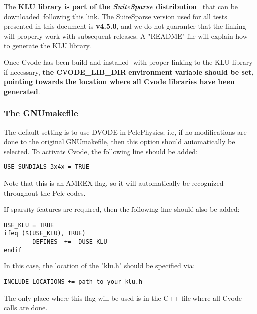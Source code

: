 \documentclass[12pt]{article}
\begin{document}
The \textbf{KLU library is part of the \textit{SuiteSparse} distribution}~\cite{SuiteSparse:2019} that can be downloaded~\href{http://faculty.cse.tamu.edu/davis/suitesparse.html}{following this link}. The SuiteSparse version used for all tests presented in this document is \textbf{v4.5.0}, and we do not guarantee that the linking will properly work with subsequent releases. A "README" file will explain how to generate the KLU library.

Once Cvode has been build and installed -with proper linking to the KLU library if necessary, \textbf{the CVODE\_LIB\_DIR environment variable should be set, pointing towards the location where all Cvode libraries have been generated}.

\subsubsection{The GNUmakefile}
\label{subsubs::GNUtype}
The default setting is to use DVODE in PelePhysics; i.e, if no modifications are done to the original GNUmakefile, then this option should automatically be selected. To activate Cvode, the following line should be added:
\begin{verbatim}
USE_SUNDIALS_3x4x = TRUE
\end{verbatim}
Note that this is an AMREX flag, so it will automatically be recognized throughout the Pele codes. 

If sparsity features are required, then the following line should also be added:
\begin{verbatim}
USE_KLU = TRUE
ifeq ($(USE_KLU), TRUE)  
        DEFINES  += -DUSE_KLU
endif
\end{verbatim}
In this case, the location of the "klu.h" should be specified via:
\begin{verbatim}
INCLUDE_LOCATIONS += path_to_your_klu.h
\end{verbatim}
The only place where this flag will be used is in the C++ file where all Cvode calls are done.

\end{document}
